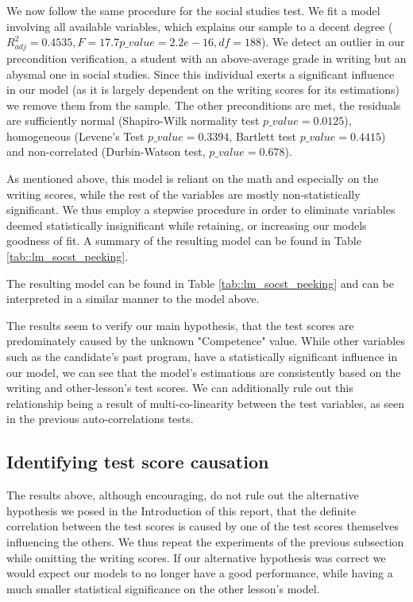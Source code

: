 \documentclass[10pt, a4paper]{article}
\begin{document}
	We now follow the same procedure for the social studies test. We fit a model involving all available variables, which explains our sample to a decent degree ($R^2_{adj} = 0.4535, F= 17.7 p\_value=2.2e-16, df=188$). We detect an outlier in our precondition verification, a student with an above-average grade in writing but an abysmal one in social studies. Since this individual exerts a significant influence in our model (as it is largely dependent on the writing scores for its estimations) we remove them from the sample. The other preconditions are met, the residuals are sufficiently normal (Shapiro-Wilk normality test $p\_value = 0.0125$), homogeneous (Levene's Test $p\_value = 0.3394$, Bartlett test $p\_value = 0.4415$) and non-correlated (Durbin-Watson test, $p\_value=0.678$).
	
	As mentioned above, this model is reliant on the math and especially on the writing scores, while the rest of the variables are mostly non-statistically significant. We thus employ a stepwise procedure in order to eliminate variables deemed statistically insignificant while retaining, or increasing our models goodness of fit. A summary of the resulting model can be found in Table \ref{tab::lm_socst_peeking}.
	
	The resulting model can be found in Table \ref{tab::lm_socst_peeking} and can be interpreted in a similar manner to the model above.
	
	The results seem to verify our main hypothesis, that the test scores are predominately caused by the unknown "Competence" value. While other variables such as the candidate's past program, have a statistically significant influence in our model, we can see that the model's estimations are consistently based on the writing and other-lesson's test scores. We can additionally rule out this relationship being a result of multi-co-linearity between the test variables, as seen in the previous auto-correlations tests.
	
	
	
	
	
	\subsection{Identifying test score causation}
	
	The results above, although encouraging, do not rule out the alternative hypothesis we posed in the Introduction of this report, that the definite correlation between the test scores is caused by one of the test scores themselves influencing the others. We thus repeat the experiments of the previous subsection while omitting the writing scores. If our alternative hypothesis was correct we would expect our models to no longer have a good performance, while having a much smaller statistical significance on the other lesson's model.
	
\end{document}
